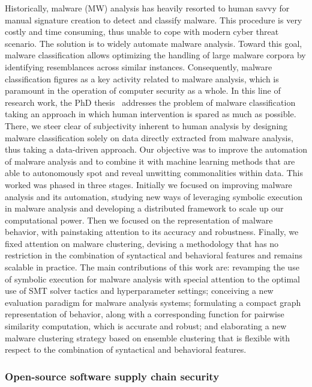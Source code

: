 Historically, malware (MW) analysis has heavily resorted to human savvy for manual signature creation to detect and classify malware. This procedure is very costly and time consuming, thus unable to cope with modern cyber threat scenario. The solution is to widely automate malware analysis. Toward this goal, malware classification allows optimizing the handling of large malware corpora by identifying resemblances across similar instances. Consequently, malware classification figures as a key activity related to malware analysis, which is paramount in the operation of computer security as a whole. In this line of research work, the PhD thesis~\cite{puodzius:tel-03935152} addresses the problem of malware classification taking an approach in which human intervention is spared as much as possible. There, we steer clear of subjectivity inherent to human analysis by designing malware classification solely on data directly extracted from malware analysis, thus taking a data-driven approach. Our objective was to improve the automation of malware analysis and to combine it with machine learning methods that are able to autonomously spot and reveal unwitting commonalities within data. This worked was phased in three stages. Initially we focused on improving malware analysis and its automation, studying new ways of leveraging symbolic execution in malware analysis and developing a distributed framework to scale up our computational power. Then we focused on the representation of malware behavior, with painstaking attention to its accuracy and robustness. Finally, we fixed attention on malware clustering, devising a methodology that has no restriction in the combination of syntactical and behavioral features and remains scalable in practice. The main contributions of this work are: revamping the use of symbolic execution for malware analysis with special attention to the optimal use of SMT solver tactics and hyperparameter settings; conceiving a new evaluation paradigm for malware analysis systems; formulating a compact graph representation of behavior, along with a corresponding function for pairwise similarity computation, which is accurate and robust; and elaborating a new malware clustering strategy based on ensemble clustering that is flexible with respect to the combination of syntactical and behavioral features.

\subsubsection{Open-source software supply chain security}


